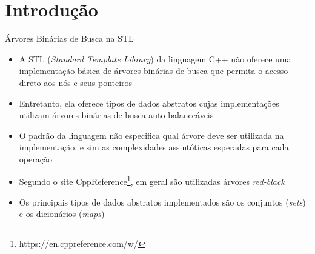 \section{Introdução}

\begin{frame}[fragile]{Árvores Binárias de Busca na STL}

    \begin{itemize}
        \item A STL (\textit{Standard Template Library}) da linguagem C++ não oferece uma
            implementação básica de árvores binárias de busca que permita o acesso direto
            aos nós e seus ponteiros

        \item Entretanto, ela oferece tipos de dados abstratos cujas implementações utilizam
            árvores binárias de busca auto-balanceáveis

        \item O padrão da linguagem não especifica qual árvore deve ser utilizada na implementação,
            e sim as complexidades assintóticas esperadas para cada operação

        \item Segundo o site CppReference\footnote{https://en.cppreference.com/w/}, em geral 
            são utilizadas árvores \textit{red-black} 

        \item Os principais tipos de dados abstratos implementados são os conjuntos 
            (\textit{sets}) e os dicionários (\textit{maps})
    \end{itemize}

\end{frame}
